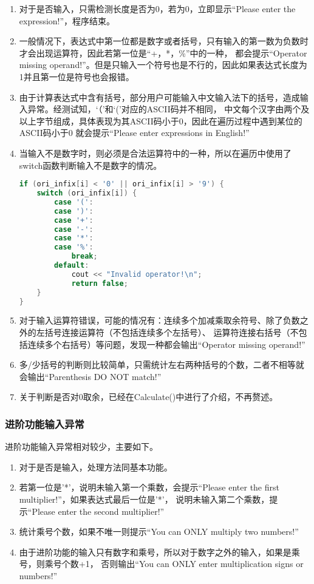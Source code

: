 \documentclass[a4paper, 11pt, UTF8]{ctexart}
\begin{document}
\begin{enumerate}
    \item 对于是否输入，只需检测长度是否为0，若为0，立即显示“Please enter the expression!”，程序结束。
    \item 一般情况下，表达式中第一位都是数字或者括号，只有输入的第一数为负数时才会出现运算符，因此若第一位是“+，*，\%”中的一种，
          都会提示“Operator missing operand!”。但是只输入一个符号也是不行的，因此如果表达式长度为1并且第一位是符号也会报错。
    \item 由于计算表达式中含有括号，部分用户可能输入中文输入法下的括号，造成输入异常。经测试知，‘（’和‘(’对应的ASCII码并不相同，
          中文每个汉字由两个及以上字节组成，具体表现为其ASCII码小于0，因此在遍历过程中遇到某位的ASCII码小于0
          就会提示“Please enter expressions in English!”
    \item 当输入不是数字时，则必须是合法运算符中的一种，所以在遍历中使用了switch函数判断输入不是数字的情况。
          \begin{lstlisting}[language=C++, basicstyle=\ttfamily]
if (ori_infix[i] < '0' || ori_infix[i] > '9') {
    switch (ori_infix[i]) {
		case '(':
		case ')':
		case '+':
		case '-':
		case '*':
		case '%':
			break;
		default:
			cout << "Invalid operator!\n";
			return false;
	}
}
          \end{lstlisting}
    \item 对于输入运算符错误，可能的情况有：连续多个加减乘取余符号、除了负数之外的左括号连接运算符（不包括连续多个左括号）、
          运算符连接右括号（不包括连续多个右括号）等问题，发现一种都会输出“Operator missing operand!”
    \item 多/少括号的判断则比较简单，只需统计左右两种括号的个数，二者不相等就会输出“Parenthesis DO NOT match!”
    \item 关于判断是否对0取余，已经在Calculate()中进行了介绍，不再赘述。
\end{enumerate}

\subsubsection{进阶功能输入异常}

进阶功能输入异常相对较少，主要如下。

\begin{enumerate}
    \item 对于是否是输入，处理方法同基本功能。
    \item 若第一位是'*'，说明未输入第一个乘数，会提示“Please enter the first multiplier!”，如果表达式最后一位是'*'，
          说明未输入第二个乘数，提示“Please enter the second multiplier!”
    \item 统计乘号个数，如果不唯一则提示“You can ONLY multiply two numbers!”
    \item 由于进阶功能的输入只有数字和乘号，所以对于数字之外的输入，如果是乘号，则乘号个数+1，
          否则输出“You can ONLY enter multiplication signs or numbers!”
\end{enumerate}
\end{document}
